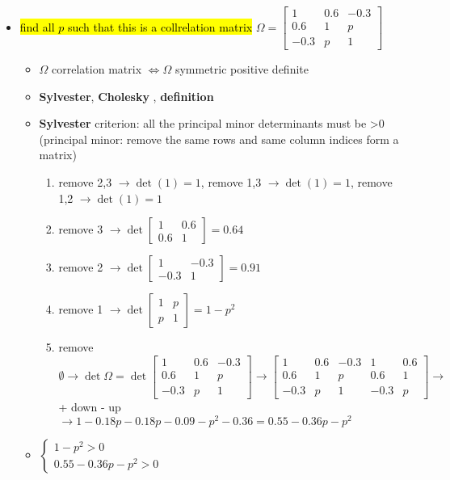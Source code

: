 \documentclass[10pt,landscape,a4paper]{article}
\begin{document}
\begin{multicols*}{4}
\begin{spacing}{0.1}
\begin{itemize}
\item \hl{find all $p$ such that this is a collrelation matrix} $\Omega = \begin{bmatrix} 1 & 0.6 & -0.3 \\  0.6 & 1 & p \\  -0.3 & p & 1 \end{bmatrix}$
\begin{itemize}
\item $\Omega$ correlation matrix $ \Leftrightarrow \Omega$ symmetric positive definite
\item \textbf{Sylvester}, \textbf{Cholesky} , \textbf{definition}
\item \textbf{Sylvester} criterion: all the principal minor determinants must be >0 (principal minor: remove the same rows  and same column indices form a matrix)
\begin{enumerate}
\item remove 2,3 $ \rightarrow \det (1) =1$, remove 1,3 $ \rightarrow  \det (1) =1$,  remove 1,2 $ \rightarrow  \det (1) =1$
\item remove 3 $\rightarrow \det \begin{bmatrix} 1 & 0.6 \\  0.6 & 1 \end{bmatrix} = 0.64$
\item remove 2 $\rightarrow \det \begin{bmatrix} 1 & -0.3 \\  -0.3 & 1 \end{bmatrix}=0.91$
\item remove 1 $\rightarrow \det \begin{bmatrix} 1 & p \\  p & 1 \end{bmatrix} = 1 -p^2$
\item remove $\emptyset \rightarrow \det \Omega =  \det \begin{bmatrix} 1 & 0.6 & -0.3 \\  0.6 & 1 & p \\  -0.3 & p & 1 \end{bmatrix}  \rightarrow \begin{bmatrix} 1 & 0.6 & -0.3  & 1 & 0.6 \\  0.6 & 1 & p & 0.6 & 1 \\  -0.3 & p & 1 & -0.3 & p \end{bmatrix} \rightarrow $ + down - up  $ \rightarrow 1 -0.18p -0.18p - 0.09 -p^2 -0.36 = 0.55 -0.36p -p^2$
\end{enumerate}
\item $\begin{cases} 1-p^2 > 0 \\ 0.55 -0.36p -p^2 >0 \end{cases}$
\end{itemize}


\end{itemize}
\end{spacing}
\end{multicols*}
\end{document}
